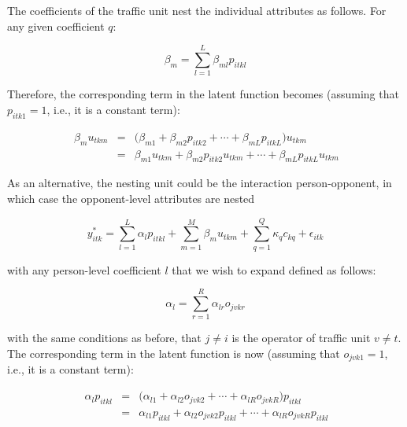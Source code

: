 \documentclass[]{elsarticle} %
\begin{document}
The coefficients of the traffic unit nest the individual attributes as
follows. For any given coefficient \(q\):

\begin{equation}
\label{eq:hierarchical-traffic-unit-coefficients}
\beta_{m}=\sum_{l=1}^L\beta_{ml}p_{itkl} 
\end{equation}

Therefore, the corresponding term in the latent function becomes
(assuming that \(p_{itk1} = 1\), i.e., it is a constant term):

\begin{equation}
\label{eq:hierarchical-traffic-unit-coefficients}
\begin{array}{rcl}\
\beta_{m}u_{tkm} &=& \big( \beta_{m1} + \beta_{m2}p_{itk2} + \cdots + \beta_{mL}p_{itkL}\big)u_{tkm}\\ 
&=& \beta_{m1}u_{tkm} + \beta_{m2}p_{itk2}u_{tkm} + \cdots + \beta_{mL}p_{itkL}u_{tkm}
\end{array}
\end{equation}

As an alternative, the nesting unit could be the interaction
person-opponent, in which case the opponent-level attributes are nested

\begin{equation}
\label{eq:latent-function-with-opponent-variables}
y_{itk}^*=\sum_{l=1}^L\alpha_lp_{itkl} + \sum_{m=1}^M\beta_mu_{tkm} + \sum_{q=1}^Q\kappa_qc_{kq} + \epsilon_{itk}
\end{equation}

\noindent with any person-level coefficient \(l\) that we wish to expand
defined as follows:

\begin{equation}
\label{eq:hierarchical-traffic-unit-coefficients}
\alpha_{l}=\sum_{r=1}^R\alpha_{lr}o_{jvkr}
\end{equation}

\noindent with the same conditions as before, that \(j\ne i\) is the
operator of traffic unit \(v\ne t\). The corresponding term in the
latent function is now (assuming that \(o_{jvk1}=1\), i.e., it is a
constant term):

\begin{equation}
\label{eq:hierarchical-traffic-unit-coefficients}
\begin{array}{rcl}\
\alpha_{l}p_{itkl} &=& \big(\alpha_{l1} + \alpha_{l2}o_{jvk2} + \cdots + \alpha_{lR}o_{jvkR} \big)p_{itkl}\\
&=& \alpha_{l1}p_{itkl} + \alpha_{l2}o_{jvk2}p_{itkl} + \cdots + \alpha_{lR}o_{jvkR}p_{itkl}
\end{array} 
\end{equation}
\end{document}
